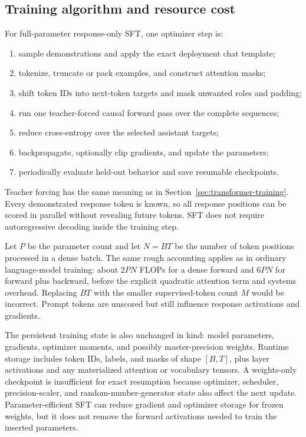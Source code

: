 \subsection{Training algorithm and resource cost}

For full-parameter response-only SFT, one optimizer step is:
\begin{enumerate}
  \item sample demonstrations and apply the exact deployment chat template;
  \item tokenize, truncate or pack examples, and construct attention masks;
  \item shift token IDs into next-token targets and mask unwanted roles and padding;
  \item run one teacher-forced causal forward pass over the complete sequences;
  \item reduce cross-entropy over the selected assistant targets;
  \item backpropagate, optionally clip gradients, and update the parameters;
  \item periodically evaluate held-out behavior and save resumable checkpoints.
\end{enumerate}

Teacher forcing has the same meaning as in Section~\ref{sec:transformer-training}. Every
demonstrated response token is known, so all response positions can be scored in parallel
without revealing future tokens. SFT does not require autoregressive decoding inside the
training step.

Let $P$ be the parameter count and let $N=BT$ be the number of token positions processed
in a dense batch. The same rough accounting applies as in ordinary language-model
training: about $2PN$ FLOPs for a dense forward and $6PN$ for forward plus backward,
before the explicit quadratic attention term and systems overhead. Replacing $BT$ with
the smaller supervised-token count $M$ would be incorrect. Prompt tokens are unscored but
still influence response activations and gradients.

The persistent training state is also unchanged in kind: model parameters, gradients,
optimizer moments, and possibly master-precision weights. Runtime storage includes token
IDs, labels, and masks of shape $[B,T]$, plus layer activations and any materialized
attention or vocabulary tensors. A weights-only checkpoint is insufficient for exact
resumption because optimizer, scheduler, precision-scaler, and random-number-generator
state also affect the next update. Parameter-efficient SFT can reduce gradient and
optimizer storage for frozen weights, but it does not remove the forward activations
needed to train the inserted parameters.
